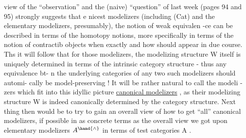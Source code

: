 view of the ``observation'' and the (naive) ``question'' of last week (pages
94 and 95) strongly suggests that  e nicest modelizers (including  (Cat)
and the elementary modelizers,  presumably),  the notion of weak equivalen%
-ce  can be described in terms of the homotopy notions,  more specifically
in terms of the notion of contractib  objects  \hand{(} when exactly
and how should appear in due course\hand{)}. Ths it will follow that for those
modelizers,  the modelizing structure W itself is uniquely determined in
terms of the intrinsic category structure  -  thus any equivalence bt-%
n the underlying categories of any two such modelizers should automi-%
cally be model-preserving !  It will be rather natural to call  the modeli%
-zers which fit into this idyllic picture \uline{canonical modelizers} ,  as their
modelizing structure W is indeed canonically determined by the category
structure.  Next thing then would be to try to gain an overall view of
how to get ``all''  canonical modelizers,  if possible in as concrete terms
as the overall view we got upon elementary modelizers $A^{\hand{\wedge}}$ in terms of  test
categories A .

